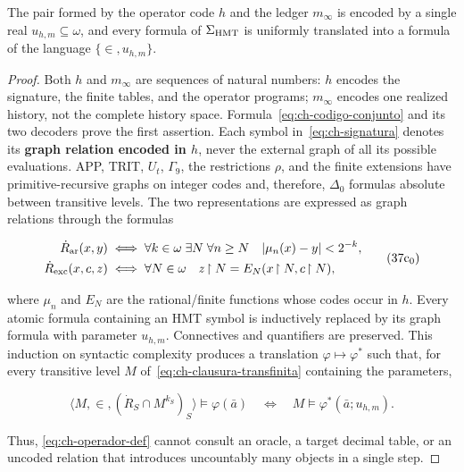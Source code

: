 \begin{lemma}
\label{thm:ch-6}
The pair formed by the operator code \(h\) and the ledger \(m_\infty\) is
encoded by a single real \(u_{h,m}\subseteq\omega\), and every formula of
\(\Sigma_{\rm HMT}\) is uniformly translated into a formula of the language
\(\{\in,u_{h,m}\}\).

\end{lemma}
\begin{proof}
Both \(h\) and \(m_\infty\) are sequences of natural numbers: \(h\) encodes
the signature, the finite tables, and the operator programs; \(m_\infty\)
encodes one realized history, not the complete history space.
Formula~\eqref{eq:ch-codigo-conjunto} and its two decoders prove the first
assertion. Each symbol in~\eqref{eq:ch-signatura} denotes its \textbf{graph
relation encoded in \(h\)}, never the external graph of all its possible
evaluations. APP, TRIT, \(U_t\), \(\Gamma_9\), the restrictions \(\rho\), and
the finite extensions have primitive-recursive graphs on integer codes and,
therefore, \(\Delta_0\) formulas absolute between transitive levels. The two
representations are expressed as graph relations through the formulas

\[
 \begin{aligned}
 \dot R_{\rm ar}(x,y)
 &\;\Longleftrightarrow\;
 \forall k\in\omega\;\exists N\;\forall n\ge N\quad
 |\mu_n(x)-y|<2^{-k},\\
 \dot R_{\rm exc}(x,c,z)
 &\;\Longleftrightarrow\;
 \forall N\in\omega\quad z\!\upharpoonright N
   =E_N(x\!\upharpoonright N,c\!\upharpoonright N),
 \end{aligned}
\tag{37c$_0$}\label{eq:ch-grafos-publicacion}
\]

where \(\mu_n\) and \(E_N\) are the rational/finite functions whose codes
occur in \(h\). Every atomic formula containing an HMT symbol is inductively
replaced by its graph formula with parameter \(u_{h,m}\). Connectives and
quantifiers are preserved. This induction on syntactic complexity produces a
translation \(\varphi\mapsto\varphi^*\) such that, for every transitive level
\(M\) of~\eqref{eq:ch-clausura-transfinita} containing the parameters,

\[
 \langle M,\in,(\dot R_S\cap M^{k_S})_S\rangle
   \models\varphi(\bar a)
 \quad\Longleftrightarrow\quad
 M\models\varphi^*(\bar a;u_{h,m}).
\tag{37c}\label{eq:ch-eliminacion-uniforme}
\]

Thus, \eqref{eq:ch-operador-def} cannot consult an oracle, a target decimal
table, or an uncoded relation that introduces uncountably many objects in a
single step.
\end{proof}

